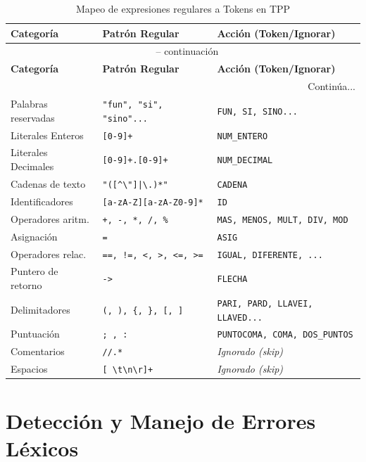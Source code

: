 \begin{table}[H]
\centering
\begin{longtable}{lll}
\toprule
\textbf{Categoría} & \textbf{Patrón Regular} & \textbf{Acción (Token/Ignorar)} \\
\midrule
\endfirsthead
\multicolumn{3}{c}{\tablename\ \thetable{} -- continuación} \\
\toprule
\textbf{Categoría} & \textbf{Patrón Regular} & \textbf{Acción (Token/Ignorar)} \\
\midrule
\endhead
\midrule
\multicolumn{3}{r}{Continúa...} \\
\endfoot
\bottomrule
\endlastfoot
Palabras reservadas & \texttt{"fun", "si", "sino"...} & \texttt{FUN, SI, SINO...} \\
Literales Enteros & \texttt{[0-9]+} & \texttt{NUM\_ENTERO} \\
Literales Decimales & \texttt{[0-9]+.[0-9]+} & \texttt{NUM\_DECIMAL} \\
Cadenas de texto & \texttt{"([\^{}\textbackslash"]|\textbackslash.)*"} & \texttt{CADENA} \\
Identificadores & \texttt{[a-zA-Z][a-zA-Z0-9]*} & \texttt{ID} \\
Operadores aritm. & \texttt{+, -, *, /, \%} & \texttt{MAS, MENOS, MULT, DIV, MOD} \\
Asignación & \texttt{=} & \texttt{ASIG} \\
Operadores relac. & \texttt{==, !=, <, >, <=, >=} & \texttt{IGUAL, DIFERENTE, ...} \\
Puntero de retorno & \texttt{->} & \texttt{FLECHA} \\
Delimitadores & \texttt{(, ), \{, \}, [, ]} & \texttt{PARI, PARD, LLAVEI, LLAVED...} \\
Puntuación & \texttt{; , :} & \texttt{PUNTOCOMA, COMA, DOS\_PUNTOS} \\
\midrule
Comentarios & \texttt{//.*} & \textit{Ignorado (skip)} \\
Espacios & \texttt{[ \textbackslash t\textbackslash n\textbackslash r]+} & \textit{Ignorado (skip)} \\
\end{longtable}
\caption{Mapeo de expresiones regulares a Tokens en TPP}
\label{tab:tokens}
\end{table}

\section{Detección y Manejo de Errores Léxicos}

